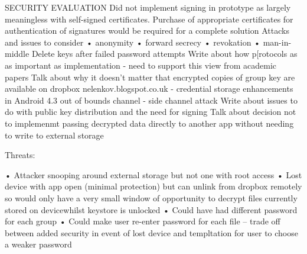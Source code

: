 SECURITY EVALUATION
Did not implement signing in prototype as largely meaningless with self-signed certificates. Purchase of appropriate certificates for authentication of signatures would be required for a complete solution
Attacks and issues to consider
• anonymity
• forward secrecy
• revokation
• man-in-middle
Delete keys after failed password attempts
Write about how p[rotocols as as important as implementation - need to support this view from academic papers
Talk about why it doesn't matter that encrypted copies of group key are available on dropbox
nelenkov.blogspot.co.uk - credential storage enhancements in Android 4.3
out of bounds channel - side channel attack
Write about issues to do with public key distribution and the need for signing
Talk about decision not to implemenmt passing decrypted data directly to another app without needing to write to external storage








Threats:

•	Attacker snooping around external storage but not one with root access
•	Lost device with app open (minimal protection) but can unlink from dropbox remotely so would only have a very small window of opportunity to decrypt files currently stored on devicewhilst keystore is unlocked
•	Could have had different password for each group
•	Could make user re-enter password for each file – trade off between added security in event of lost device and templtation for user to choose a weaker password










